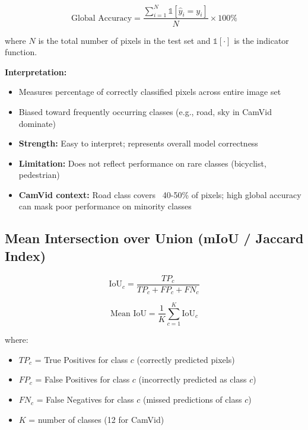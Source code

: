 \documentclass[11pt,a4paper]{report}
\begin{document}
\begin{equation}
\text{Global Accuracy} = \frac{\sum_{i=1}^{N} \mathbb{1}[\hat{y}_i = y_i]}{N} \times 100\%
\end{equation}

where $N$ is the total number of pixels in the test set and $\mathbb{1}[\cdot]$ is the indicator function.

\textbf{Interpretation:}
\begin{itemize}
  \item Measures percentage of correctly classified pixels across entire image set
  \item Biased toward frequently occurring classes (e.g., road, sky in CamVid dominate)
  \item \textbf{Strength:} Easy to interpret; represents overall model correctness
  \item \textbf{Limitation:} Does not reflect performance on rare classes (bicyclist, pedestrian)
  \item \textbf{CamVid context:} Road class covers ~40-50\% of pixels; high global accuracy can mask poor performance on minority classes
\end{itemize}

\subsection{Mean Intersection over Union (mIoU / Jaccard Index)}

\begin{equation}
\text{IoU}_c = \frac{TP_c}{TP_c + FP_c + FN_c}
\end{equation}

\begin{equation}
\text{Mean IoU} = \frac{1}{K} \sum_{c=1}^{K} \text{IoU}_c
\end{equation}

where:
\begin{itemize}
  \item $TP_c$ = True Positives for class $c$ (correctly predicted pixels)
  \item $FP_c$ = False Positives for class $c$ (incorrectly predicted as class $c$)
  \item $FN_c$ = False Negatives for class $c$ (missed predictions of class $c$)
  \item $K$ = number of classes (12 for CamVid)
\end{itemize}
\end{document}
